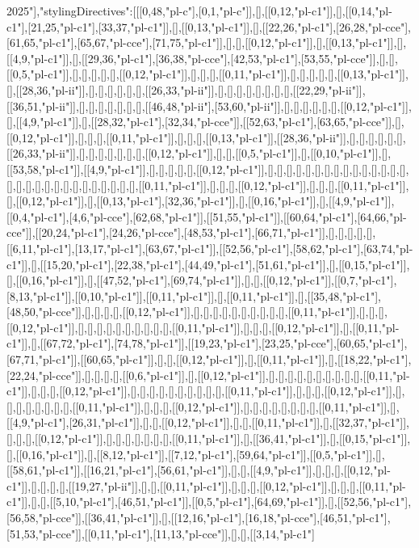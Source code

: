2025"],"stylingDirectives":[[[0,48,"pl-c"],[0,1,"pl-c"]],[],[[0,12,"pl-c1"]],[],[[0,14,"pl-c1"],[21,25,"pl-c1"],[33,37,"pl-c1"]],[],[[0,13,"pl-c1"]],[],[[22,26,"pl-c1"],[26,28,"pl-cce"],[61,65,"pl-c1"],[65,67,"pl-cce"],[71,75,"pl-c1"]],[],[],[[0,12,"pl-c1"]],[],[[0,13,"pl-c1"]],[],[[4,9,"pl-c1"]],[],[[29,36,"pl-c1"],[36,38,"pl-cce"],[42,53,"pl-c1"],[53,55,"pl-cce"]],[],[],[[0,5,"pl-c1"]],[],[],[],[],[],[[0,12,"pl-c1"]],[],[],[],[[0,11,"pl-c1"]],[],[],[],[],[],[[0,13,"pl-c1"]],[],[[28,36,"pl-ii"]],[],[],[],[],[],[],[[26,33,"pl-ii"]],[],[],[],[],[],[],[],[],[[22,29,"pl-ii"]],[[36,51,"pl-ii"]],[],[],[],[],[],[],[],[[46,48,"pl-ii"],[53,60,"pl-ii"]],[],[],[],[],[],[],[[0,12,"pl-c1"]],[],[[4,9,"pl-c1"]],[],[[28,32,"pl-c1"],[32,34,"pl-cce"]],[[52,63,"pl-c1"],[63,65,"pl-cce"]],[],[[0,12,"pl-c1"]],[],[],[],[[0,11,"pl-c1"]],[],[],[],[[0,13,"pl-c1"]],[[28,36,"pl-ii"]],[],[],[],[],[],[],[[26,33,"pl-ii"]],[],[],[],[],[],[],[],[[0,12,"pl-c1"]],[],[],[[0,5,"pl-c1"]],[],[[0,10,"pl-c1"]],[],[[53,58,"pl-c1"]],[[4,9,"pl-c1"]],[],[],[],[],[],[[0,12,"pl-c1"]],[],[],[],[],[],[],[],[],[],[],[],[],[],[],[],[],[],[],[],[],[],[],[],[],[],[],[],[],[],[[0,11,"pl-c1"]],[],[],[],[[0,12,"pl-c1"]],[],[],[],[[0,11,"pl-c1"]],[],[[0,12,"pl-c1"]],[],[[0,13,"pl-c1"],[32,36,"pl-c1"]],[],[[0,16,"pl-c1"]],[],[[4,9,"pl-c1"]],[[0,4,"pl-c1"],[4,6,"pl-cce"],[62,68,"pl-c1"]],[[51,55,"pl-c1"]],[[60,64,"pl-c1"],[64,66,"pl-cce"]],[[20,24,"pl-c1"],[24,26,"pl-cce"],[48,53,"pl-c1"],[66,71,"pl-c1"]],[],[],[],[],[],[[6,11,"pl-c1"],[13,17,"pl-c1"],[63,67,"pl-c1"]],[[52,56,"pl-c1"],[58,62,"pl-c1"],[63,74,"pl-c1"]],[],[[15,20,"pl-c1"],[22,38,"pl-c1"],[44,49,"pl-c1"],[51,61,"pl-c1"]],[],[[0,15,"pl-c1"]],[],[[0,16,"pl-c1"]],[],[[47,52,"pl-c1"],[69,74,"pl-c1"]],[],[],[[0,12,"pl-c1"]],[[0,7,"pl-c1"],[8,13,"pl-c1"]],[[0,10,"pl-c1"]],[[0,11,"pl-c1"]],[],[[0,11,"pl-c1"]],[],[[35,48,"pl-c1"],[48,50,"pl-cce"]],[],[],[],[],[[0,12,"pl-c1"]],[],[],[],[],[],[],[],[],[],[],[[0,11,"pl-c1"]],[],[],[],[[0,12,"pl-c1"]],[],[],[],[],[],[],[],[],[],[],[[0,11,"pl-c1"]],[],[],[],[[0,12,"pl-c1"]],[],[[0,11,"pl-c1"]],[],[[67,72,"pl-c1"],[74,78,"pl-c1"]],[[19,23,"pl-c1"],[23,25,"pl-cce"],[60,65,"pl-c1"],[67,71,"pl-c1"]],[[60,65,"pl-c1"]],[],[],[[0,12,"pl-c1"]],[],[[0,11,"pl-c1"]],[],[[18,22,"pl-c1"],[22,24,"pl-cce"]],[],[],[],[],[[0,6,"pl-c1"]],[],[[0,12,"pl-c1"]],[],[],[],[],[],[],[],[],[],[],[[0,11,"pl-c1"]],[],[],[],[[0,12,"pl-c1"]],[],[],[],[],[],[],[],[],[],[],[[0,11,"pl-c1"]],[],[],[],[[0,12,"pl-c1"]],[],[],[],[],[],[],[],[],[[0,11,"pl-c1"]],[],[],[],[[0,12,"pl-c1"]],[],[],[],[],[],[],[],[],[[0,11,"pl-c1"]],[],[[4,9,"pl-c1"],[26,31,"pl-c1"]],[],[],[[0,12,"pl-c1"]],[],[],[[0,11,"pl-c1"]],[],[[32,37,"pl-c1"]],[],[],[],[[0,12,"pl-c1"]],[],[],[],[],[],[],[],[[0,11,"pl-c1"]],[],[[36,41,"pl-c1"]],[],[[0,15,"pl-c1"]],[],[[0,16,"pl-c1"]],[],[[8,12,"pl-c1"]],[[7,12,"pl-c1"],[59,64,"pl-c1"]],[[0,5,"pl-c1"]],[],[[58,61,"pl-c1"]],[[16,21,"pl-c1"],[56,61,"pl-c1"]],[],[],[[4,9,"pl-c1"]],[],[],[],[[0,12,"pl-c1"]],[],[],[],[],[[19,27,"pl-ii"]],[],[],[[0,11,"pl-c1"]],[],[],[],[[0,12,"pl-c1"]],[],[],[],[[0,11,"pl-c1"]],[],[],[[5,10,"pl-c1"],[46,51,"pl-c1"]],[[0,5,"pl-c1"],[64,69,"pl-c1"]],[],[[52,56,"pl-c1"],[56,58,"pl-cce"]],[[36,41,"pl-c1"]],[],[[12,16,"pl-c1"],[16,18,"pl-cce"],[46,51,"pl-c1"],[51,53,"pl-cce"]],[[0,11,"pl-c1"],[11,13,"pl-cce"]],[],[],[[3,14,"pl-c1"]